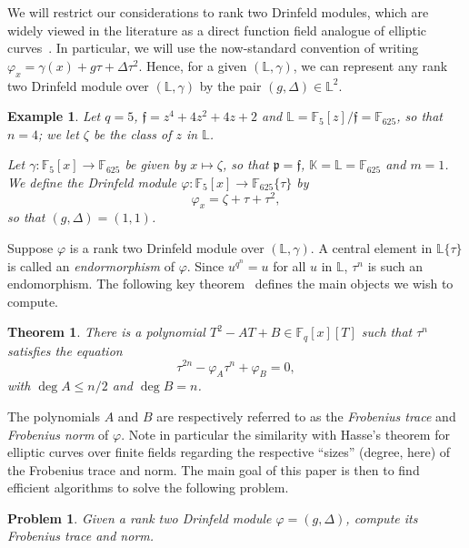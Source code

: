\documentclass[sigconf]{acmart}
\newtheorem{theorem}{Theorem}
\newtheorem{example}{Example}
\newtheorem{problem}{Problem}
\newcommand{\A}{\mathbb{A}}
\newcommand{\Q}{\mathbb{Q}}
\renewcommand{\P}{\mathbb{P}}
\newcommand{\K}{\mathbb{K}}
\newcommand{\F}{\mathbb{F}}
\renewcommand{\L}{\mathbb{L}}
\newcommand{\ang}[1]{\{#1\}}
\newcommand{\frakf}{\mathfrak{f}}
\newcommand{\frakp}{\mathfrak{p}}
\begin{document}
We will restrict our considerations to rank two Drinfeld modules,
which are widely viewed in the literature as a direct function field
analogue of elliptic curves~\cite{GEKELE1991187}. In particular, we
will use the now-standard convention of writing $\varphi_x = \gamma(x)
+ g \tau + \Delta \tau^2$. Hence, for a given $(\L,\gamma)$, we can
represent any rank two Drinfeld module over $(\L,\gamma)$ by the pair
$(g,\Delta) \in\L^2$.

\begin{example}
  Let $q = 5$, $\frakf = z^4 +4z^2+ 4z + 2$ and $\L = \F_5[z]/\frakf =
  \mathbb{F}_{625}$, so that $n=4$; we let $\zeta$ be the class of $z$ in
  $\L$.

  Let $\gamma: \F_5[x] \to \F_{625}$ be given by $x \mapsto \zeta$, so
  that $\frakp=\frakf$, $\K=\L=\F_{625}$ and $m=1$. We define the Drinfeld
  module $\varphi: \F_5[x] \to \F_{625}\ang{\tau}$ by
\[ \varphi_x = \zeta + \tau + \tau^2,\]
so that $(g,\Delta)=(1,1)$.
\end{example}


Suppose $\varphi$ is a rank two Drinfeld module over $(\L,\gamma)$. A
central element in $\L\ang{\tau}$ is called an {\em endormorphism} of
$\varphi$. Since $u^{q^n} = u$ for all $u$ in $\L$, $\tau^n$ is such
an endomorphism. The following key theorem~\cite{GEKELE1991187}
defines the main objects we wish to compute.
\begin{theorem}\label{charpoly}
  There is a polynomial $T^2 -AT + B \in \F_q[x][T]$ such that
  $\tau^n$ satisfies the  equation
  \begin{equation} \tau^{2n} - \varphi_A \tau^n + \varphi_B = 0,\end{equation}
  with $\deg A \le n/2$ and $\deg B=n$.
\end{theorem}
The polynomials $A$ and $B$ are respectively referred to as the
\textit{Frobenius trace} and \textit{Frobenius norm} of $\varphi$.
Note in particular the similarity with Hasse's theorem for elliptic
curves over finite fields regarding the respective ``sizes'' (degree,
here) of the Frobenius trace and norm.  The main goal of this paper is
then to find efficient algorithms to solve the following problem.
\begin{problem}\label{pb1}
  Given a rank two Drinfeld module $\varphi = (g,\Delta)$, compute its
  Frobenius trace and norm.
\end{problem}
\end{document}
